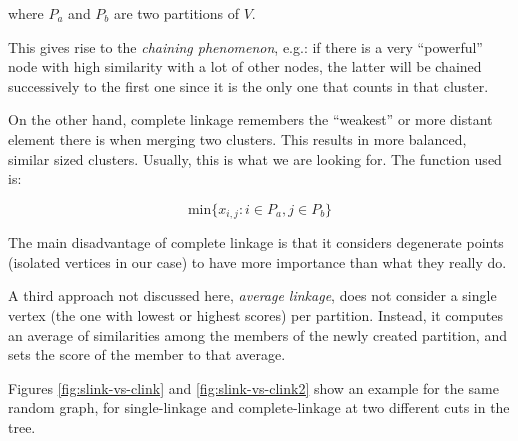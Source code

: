 \documentclass[12pt,a4paper]{article}
\begin{document}
where ${P_a}$ and $P_b$ are two partitions of $V$.

This gives rise to the \emph{chaining phenomenon}, e.g.: if
there is a very ``powerful'' node with high similarity with a lot of
other nodes, the latter will be chained successively to the first
one since it is the only one that counts in that cluster.

On the other hand, complete linkage remembers the ``weakest'' or more
distant element there is when merging two clusters. This results in
more balanced, similar sized clusters. Usually, this is what we are
looking for. The function used is:

$$ \mathrm{min}\{x_{i,j} : i \in P_a, j \in P_b\} $$

The main disadvantage of complete linkage is that it considers
degenerate points (isolated vertices in our case) to have more
importance than what they really do.

A third approach not discussed here, \emph{average linkage}, does not
consider a single vertex (the one with lowest or highest scores) per
partition. Instead, it computes an average of similarities among the
members of the newly created partition, and sets the score of the
member to that average.

Figures \ref{fig:slink-vs-clink} and \ref{fig:slink-vs-clink2} show an
example for the same random graph, for single-linkage and
complete-linkage at two different cuts in the tree.
\end{document}
